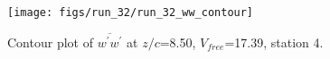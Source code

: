 \begin{figure}[H]
\centering
\texttt{[image: figs/run\_32/run\_32\_ww\_contour]}
\caption{Contour plot of $\overline{w^\prime w^\prime}$ at $z/c$=8.50, $V_{free}$=17.39, station 4.}
\label{fig:run_32_ww_contour}
\end{figure}


